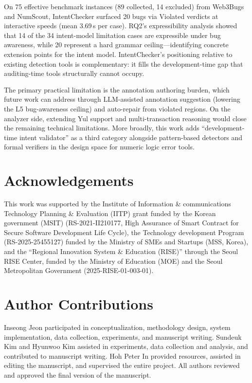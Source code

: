 \documentclass[pdflatex,sn-basic]{sn-jnl}%
\theoremstyle{thmstyleone}%
\theoremstyle{thmstyletwo}%
\theoremstyle{thmstylethree}%
\begin{document}
On 75 effective benchmark instances (89 collected, 14 excluded) from Web3Bugs and NumScout, IntentChecker surfaced 20 bugs via Violated verdicts at interactive speeds (mean 3.69\,s per case).
RQ2's expressibility analysis showed that 14 of the 34 intent-model limitation cases are expressible under bug awareness, while 20 represent a hard grammar ceiling---identifying concrete extension points for the intent model.
IntentChecker's positioning relative to existing detection tools is complementary: it fills the development-time gap that auditing-time tools structurally cannot occupy.

The primary practical limitation is the annotation authoring burden, which future work can address through LLM-assisted annotation suggestion (lowering the L5 bug-awareness ceiling) and auto-repair from violated regions.
On the analyzer side, extending Yul support and multi-transaction reasoning would close the remaining technical limitations.
More broadly, this work adds ``development-time intent validator'' as a third category alongside pattern-based detectors and formal verifiers in the design space for numeric logic error tools.

\section*{Acknowledgements}
This work was supported by the Institute of Information \& communications Technology Planning \& Evaluation (IITP) grant funded by the Korean government (MSIT) (RS-2021-II210177, High Assurance of Smart Contract for Secure Software Development Life Cycle), the Technology development Program (RS-2025-25455127) funded by the Ministry of SMEs and Startups (MSS, Korea), and the ``Regional Innovation System \& Education (RISE)'' through the Seoul RISE Center, funded by the Ministry of Education (MOE) and the Seoul Metropolitan Government (2025-RISE-01-003-01).

\section*{Author Contributions}
Inseong Jeon participated in conceptualization, methodology design, system implementation, data collection, experiments, and manuscript writing. Sundeuk Kim and Hyunwoo Kim assisted in experiments, data collection and analysis, and contributed to manuscript writing. Hoh Peter In provided resources, assisted in editing the manuscript, and supervised the entire project. All authors reviewed and approved the final version of the manuscript.
\end{document}
